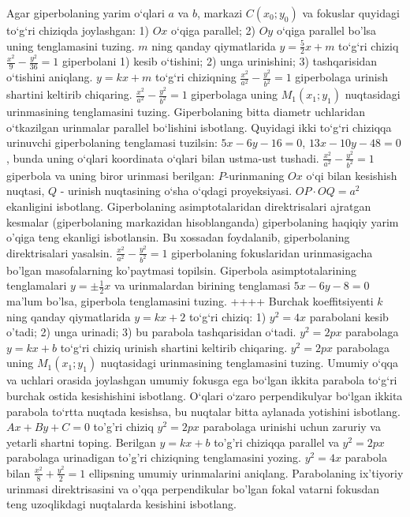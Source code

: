Agar giperbolaning yarim o‘qlari $a$ va $b$, markazi $C\left(x_0; y_0\right) $ va fokuslar quyidagi to‘g‘ri chiziqda joylashgan: 1) $O x$ o‘qiga parallel; 2) $O y$ o‘qiga parallel bo'lsa uning tenglamasini tuzing.
$m$ ning qanday qiymatlarida $y=\frac{5}{2} x+m$ to‘g‘ri chiziq $\frac{x^2}{9}-\frac{y^2}{36}=1$ giperbolani 1) kesib o‘tishini; 2) unga urinishini; 3) tashqarisidan o‘tishini aniqlang.
$y=k x+m$ to‘g‘ri chiziqning $\frac{x^2}{a^2}-\frac{y^2}{b^2}=1$ giperbolaga urinish shartini keltirib chiqaring.
$\frac{x^2}{a^2}-\frac{y^2}{b^2}=1$ giperbolaga uning $M_1\left(x_1; y_1\right) $ nuqtasidagi urinmasining tenglamasini tuzing.
Giperbolaning bitta diametr uchlaridan o‘tkazilgan urinmalar parallel bo‘lishini isbotlang.
Quyidagi ikki to‘g‘ri chiziqqa urinuvchi giperbolaning tenglamasi tuzilsin: $5x-6y-16=0$, $13x-10y-48=0$, bunda uning o‘qlari koordinata o‘qlari bilan ustma-ust tushadi.
$\frac{x^2}{a^2}-\frac{y^2}{b^2}=1$ giperbola va uning biror urinmasi berilgan: $P$-urinmaning $O x$ o‘qi bilan kesishish nuqtasi, $Q$ - urinish nuqtasining o‘sha o‘qdagi proyeksiyasi. $O P \cdot O Q=a^2$ ekanligini isbotlang.
Giperbolaning asimptotalaridan direktrisalari ajratgan kesmalar (giperbolaning markazidan hisoblanganda) giperbolaning haqiqiy yarim o'qiga teng ekanligi isbotlansin. Bu xossadan foydalanib, giperbolaning direktrisalari yasalsin.
$\frac{x^2}{a^2}-\frac{y^2}{b^2}=1$ giperbolaning fokuslaridan urinmasigacha bo'lgan masofalarning ko'paytmasi topilsin.
Giperbola asimptotalarining tenglamalari $y= \pm \frac{1}{2} x$ va urinmalardan birining tenglamasi $5 x-6 y-8=0$ ma'lum bo'lsa, giperbola tenglamasini tuzing.
++++
Burchak koeffitsiyenti $k$ ning qanday qiymatlarida $y=kx+2$ to‘g‘ri chiziq: 1) $y^2=4x$ parabolani kesib o'tadi; 2) unga urinadi; 3) bu parabola tashqarisidan o‘tadi.
$y^2=2 p x$ parabolaga $y=k x+b$ to‘g‘ri chiziq urinish shartini keltirib chiqaring.
$y^2=2 p x$ parabolaga uning $M_1\left(x_1; y_1\right) $ nuqtasidagi urinmasining tenglamasini tuzing.
Umumiy o‘qqa va uchlari orasida joylashgan umumiy fokusga ega bo‘lgan ikkita parabola to‘g‘ri burchak ostida kesishishini isbotlang.
O‘qlari o‘zaro perpendikulyar bo‘lgan ikkita parabola to‘rtta nuqtada kesishsa, bu nuqtalar bitta aylanada yotishini isbotlang.
$A x+B y+C=0$ to'g'ri chiziq $y^2=2 p x$ parabolaga urinishi uchun zaruriy va yetarli shartni toping.
Berilgan $y=k x+b$ to'g'ri chiziqqa parallel va $y^2=2 p x$ parabolaga urinadigan to'g'ri chiziqning tenglamasini yozing.
$y^2=4 x$ parabola bilan $\frac{x^2}{8}+\frac{y^2}{2}=1$ ellipsning umumiy urinmalarini aniqlang.
Parabolaning ix'tiyoriy urinmasi direktrisasini va o'qqa perpendikular bo'lgan fokal vatarni fokusdan teng uzoqlikdagi nuqtalarda kesishini isbotlang.
